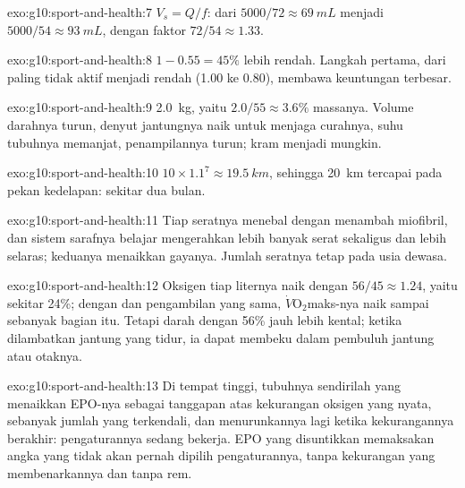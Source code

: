\begin{solution}{exo:g10:sport-and-health:7}
$V_s = Q/f$: dari $5000/72 \approx \qty{69}{mL}$ menjadi $5000/54 \approx
\qty{93}{mL}$, dengan faktor $72/54 \approx 1.33$.
\end{solution}

\begin{solution}{exo:g10:sport-and-health:8}
$1 - 0.55 = 45\%$ lebih rendah. Langkah pertama, dari paling tidak
aktif menjadi rendah (1.00 ke 0.80), membawa keuntungan terbesar.
\end{solution}

\begin{solution}{exo:g10:sport-and-health:9}
\qty{2.0}{kg}, yaitu $2.0/55 \approx 3.6\%$ massanya. Volume darahnya
turun, denyut jantungnya naik untuk menjaga curahnya, suhu tubuhnya
memanjat, penampilannya turun; kram menjadi mungkin.
\end{solution}

\begin{solution}{exo:g10:sport-and-health:10}
$10 \times 1.1^7 \approx \qty{19.5}{km}$, sehingga \qty{20}{km}
tercapai pada pekan kedelapan: sekitar dua bulan.
\end{solution}

\begin{solution}{exo:g10:sport-and-health:11}
Tiap seratnya menebal dengan menambah miofibril, dan sistem sarafnya
belajar mengerahkan lebih banyak serat sekaligus dan lebih selaras;
keduanya menaikkan gayanya. Jumlah seratnya tetap pada usia dewasa.
\end{solution}

\begin{solution}{exo:g10:sport-and-health:12}
Oksigen tiap liternya naik dengan $56/45 \approx 1.24$, yaitu sekitar
24\%; dengan  dan pengambilan yang sama,
$\dot V\!\mathrm{O_2}$maks-nya naik sampai sebanyak bagian itu. Tetapi
darah dengan 56\%  jauh lebih kental; ketika dilambatkan jantung
yang tidur, ia dapat membeku dalam pembuluh jantung atau otaknya.
\end{solution}

\begin{solution}{exo:g10:sport-and-health:13}
Di tempat tinggi, tubuhnya sendirilah yang menaikkan EPO-nya sebagai
tanggapan atas kekurangan oksigen yang nyata, sebanyak jumlah yang
terkendali, dan menurunkannya lagi ketika kekurangannya berakhir:
pengaturannya sedang bekerja. EPO yang disuntikkan memaksakan angka
yang tidak akan pernah dipilih pengaturannya, tanpa kekurangan yang
membenarkannya dan tanpa rem.
\end{solution}

